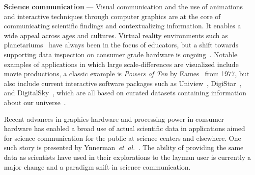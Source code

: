 \documentclass[journal]{vgtc}                %
\newcommand{\etal}{\emph{et~al.}}
\begin{document}

\noindent\textbf{Science communication} ---
Visual communication and the use of animations and interactive techniques through computer graphics are at the core of communicating scientific findings and contextualizing information. It enables a wide appeal across ages and cultures.
Virtual reality environments such as planetariums~\cite{magnor2010progress, liu20013} have always been in the focus of educators, but a shift towards supporting data inspection on consumer grade hardware is ongoing~\cite{nakasone2009astrosim}.
Notable examples of applications in which large scale-differences are visualized include movie productions, a classic example is \emph{Powers of Ten} by Eames~\cite{powersOfTen} from 1977, but also include current interactive software packages such as Uniview~\cite{KHECY10}, DigiStar~\cite{ES16}, and DigitalSky~\cite{Sky16}, which are all based on curated datasets containing information about our universe~\cite{abbott2006digital}. 

Recent advances in graphics hardware and processing power in consumer hardware has enabled a broad use of actual scientific data in applications aimed for science communication for the public at science centers and elsewhere.
One such story is presented by Ynnerman~\etal~\cite{ynnerman2016interactive}.
The ability of providing the same data as scientists have used in their explorations to the layman user is currently a major change and a paradigm shift in science communication.
\end{document}
